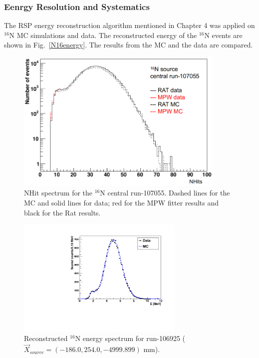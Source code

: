\subsubsection{Eenrgy Resolution and Systematics}
The RSP energy reconstruction algorithm mentioned in Chapter 4 was applied on $^{16}$N MC simulations and data. 
The reconstructed energy of the $^{16}$N events are shown in Fig.~\ref{N16energy}. The results from the MC and the data are compared.
\begin{figure}[htbp]
	\centering
	\includegraphics[width=10cm]{N16_nhits_107055.png}
	\caption{NHit spectrum for the $^{16}$N central run-107055. Dashed lines for the MC and solid lines for data; red for the MPW fitter results and black for the Rat results.}
	\label{N16nhits}
\end{figure}

\begin{figure}[htbp]
	\centering
	\includegraphics[width=8cm]{N16energyMPWcompare_106925.pdf}
	\caption{Reconstructed $^{16}$N energy spectrum for run-106925 ($\vec{X}_{source}=(-186.0,254.0,-4999.899)$ mm).}
	\label{N16_106925}
\end{figure}

